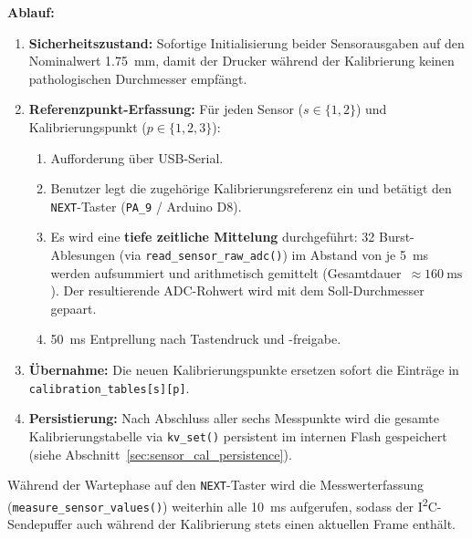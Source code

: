 \textbf{Ablauf:}
\begin{enumerate}
  \item \textbf{Sicherheitszustand:} Sofortige Initialisierung beider Sensorausgaben auf den Nominalwert \qty{1,75}{\milli\meter}, damit der Drucker während der Kalibrierung keinen pathologischen Durchmesser empfängt.
  \item \textbf{Referenzpunkt-Erfassung:} Für jeden Sensor ($s \in \{1, 2\}$) und Kalibrierungspunkt ($p \in \{1, 2, 3\}$):
    \begin{enumerate}
      \item Aufforderung über USB-Serial.
      \item Benutzer legt die zugehörige Kalibrierungsreferenz ein und betätigt den \texttt{NEXT}-Taster (\texttt{PA\_9} / Arduino D8).
      \item Es wird eine \textbf{tiefe zeitliche Mittelung} durchgeführt: \num{32} Burst-Ablesungen (via \texttt{read\_sensor\_raw\_adc()}) im Abstand von je \qty{5}{\milli\second} werden aufsummiert und arithmetisch gemittelt (Gesamtdauer~$\approx \qty{160}{\milli\second}$). Der resultierende ADC-Rohwert wird mit dem Soll-Durchmesser gepaart.
      \item \qty{50}{\milli\second} Entprellung nach Tastendruck und -freigabe.
    \end{enumerate}
  \item \textbf{Übernahme:} Die neuen Kalibrierungspunkte ersetzen sofort die Einträge in \texttt{calibration\_tables[s][p]}.
  \item \textbf{Persistierung:} Nach Abschluss aller sechs Messpunkte wird die gesamte Kalibrierungstabelle via \texttt{kv\_set()} persistent im internen Flash gespeichert (siehe Abschnitt~\ref{sec:sensor_cal_persistence}).
\end{enumerate}

Während der Wartephase auf den \texttt{NEXT}-Taster wird die Messwerterfassung (\texttt{measure\_sensor\_values()}) weiterhin alle \qty{10}{\milli\second} aufgerufen, sodass der I\textsuperscript{2}C-Sendepuffer auch während der Kalibrierung stets einen aktuellen Frame enthält.

